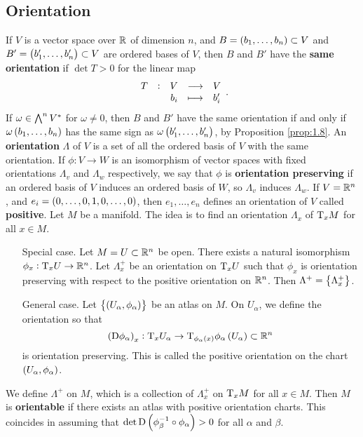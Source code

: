 \pagebreak

\subsection{Orientation}

If $ V $ is a vector space over $ \mathbb{R} $ of dimension $ n $, and $ B = \br{b_1, \dots, b_n} \subset V $ and $ B' = \br{b_1', \dots, b_n'} \subset V $ are ordered bases of $ V $, then $ B $ and $ B' $ have the \textbf{same orientation} if $ \det T > 0 $ for the linear map
$$ \function[T]{V}{V}{b_i}{b_i'}. $$
If $ \omega \in \textstyle\bigwedge^nV^* $ for $ \omega \ne 0 $, then $ B $ and $ B' $ have the same orientation if and only if $ \omega\br{b_1, \dots, b_n} $ has the same sign as $ \omega\br{b_1', \dots, b_n'} $, by Proposition \ref{prop:1.8}. An \textbf{orientation} $ \Lambda $ of $ V $ is a set of all the ordered basis of $ V $ with the same orientation. If $ \phi : V \to W $ is an isomorphism of vector spaces with fixed orientations $ \Lambda_v $ and $ \Lambda_w $ respectively, we say that $ \phi $ is \textbf{orientation preserving} if an ordered basis of $ V $ induces an ordered basis of $ W $, so $ \Lambda_v $ induces $ \Lambda_w $. If $ V = \mathbb{R}^n $, and $ e_i = \br{0, \dots, 0, 1, 0, \dots, 0} $, then $ e_1, \dots, e_n $ defines an orientation of $ V $ called \textbf{positive}. Let $ M $ be a manifold. The idea is to find an orientation $ \Lambda_x $ of $ \mathrm{T}_xM $ for all $ x \in M $.
\begin{itemize}[leftmargin=1in]
\item[Special case.] Let $ M = U \subset \mathbb{R}^n $ be open. There exists a natural isomorphism $ \phi_x : \mathrm{T}_xU \to \mathbb{R}^n $. Let $ \Lambda_x^+ $ be an orientation on $ \mathrm{T}_xU $ such that $ \phi_x $ is orientation preserving with respect to the positive orientation on $ \mathbb{R}^n $. Then $ \Lambda^+ = \cbr{\Lambda_x^+} $.
\item[General case.] Let $ \cbr{\br{U_\alpha, \phi_\alpha}} $ be an atlas on $ M $. On $ U_\alpha $, we define the orientation so that
$$ \br{\D\phi_\alpha}_x : \T_xU_\alpha \to \T_{\phi_\alpha\br{x}}\phi_\alpha\br{U_\alpha} \subset \RR^n $$
is orientation preserving. This is called the positive orientation on the chart $ \br{U_\alpha, \phi_\alpha} $.
\end{itemize}
We define $ \Lambda^+ $ on $ M $, which is a collection of $ \Lambda_x^+ $ on $ \mathrm{T}_xM $ for all $ x \in M $. Then $ M $ is \textbf{orientable} if there exists an atlas with positive orientation charts. This coincides in assuming that $ \det \D\br{\phi_\beta^{-1} \circ \phi_\alpha} > 0 $ for all $ \alpha $ and $ \beta $.

